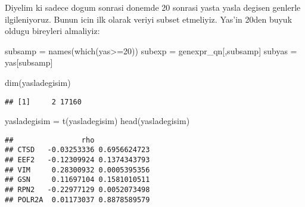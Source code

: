 \documentclass[
]{book}
\newenvironment{Shaded}{\begin{snugshade}}{\end{snugshade}}
\newcommand{\AttributeTok}[1]{\textcolor[rgb]{0.77,0.63,0.00}{#1}}
\newcommand{\ControlFlowTok}[1]{\textcolor[rgb]{0.13,0.29,0.53}{\textbf{#1}}}
\newcommand{\DecValTok}[1]{\textcolor[rgb]{0.00,0.00,0.81}{#1}}
\newcommand{\FunctionTok}[1]{\textcolor[rgb]{0.00,0.00,0.00}{#1}}
\newcommand{\NormalTok}[1]{#1}
\newcommand{\OtherTok}[1]{\textcolor[rgb]{0.56,0.35,0.01}{#1}}
\newcommand{\SpecialCharTok}[1]{\textcolor[rgb]{0.00,0.00,0.00}{#1}}
\newcommand{\StringTok}[1]{\textcolor[rgb]{0.31,0.60,0.02}{#1}}
\begin{document}
Diyelim ki sadece dogum sonrasi donemde 20 sonrasi yasta yasla degisen genlerle ilgileniyoruz. Bunun icin ilk olarak veriyi subset etmeliyiz. Yas'in 20den buyuk oldugu bireyleri almaliyiz:

\begin{Shaded}
\begin{Highlighting}[]
\NormalTok{subsamp }\OtherTok{=} \FunctionTok{names}\NormalTok{(}\FunctionTok{which}\NormalTok{(yas}\SpecialCharTok{\textgreater{}=}\DecValTok{20}\NormalTok{))}
\NormalTok{subexp }\OtherTok{=}\NormalTok{ genexpr\_qn[,subsamp]}
\NormalTok{subyas }\OtherTok{=}\NormalTok{ yas[subsamp]}
\end{Highlighting}
\end{Shaded}

\begin{Shaded}
\end{Shaded}

\begin{Shaded}
\begin{Highlighting}[]
\FunctionTok{dim}\NormalTok{(yasladegisim)}
\end{Highlighting}
\end{Shaded}

\begin{verbatim}
## [1]     2 17160
\end{verbatim}

\begin{Shaded}
\begin{Highlighting}[]
\NormalTok{yasladegisim }\OtherTok{=} \FunctionTok{t}\NormalTok{(yasladegisim)}
\FunctionTok{head}\NormalTok{(yasladegisim)}
\end{Highlighting}
\end{Shaded}

\begin{verbatim}
##                rho             
## CTSD   -0.03253336 0.6956624723
## EEF2   -0.12309924 0.1374343793
## VIM     0.28300932 0.0005395356
## GSN     0.11697104 0.1581010511
## RPN2   -0.22977129 0.0052073498
## POLR2A  0.01173037 0.8878589579
\end{verbatim}
\end{document}
